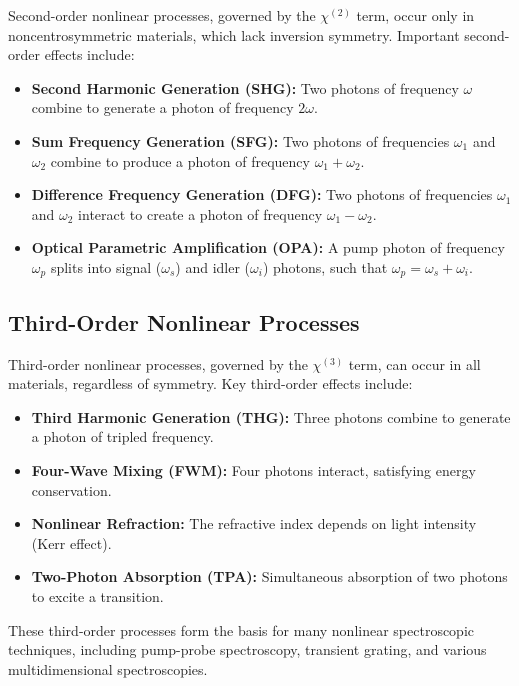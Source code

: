 \noindent 
Second-order nonlinear processes, governed by the $\chi^{(2)}$ term, occur only in noncentrosymmetric materials, which lack inversion symmetry. Important second-order effects include:

\begin{itemize}
	\item \textbf{Second Harmonic Generation (SHG):} Two photons of frequency $\omega$ combine to generate a photon of frequency $2\omega$.
	\item \textbf{Sum Frequency Generation (SFG):} Two photons of frequencies $\omega_1$ and $\omega_2$ combine to produce a photon of frequency $\omega_1 + \omega_2$.
	\item \textbf{Difference Frequency Generation (DFG):} Two photons of frequencies $\omega_1$ and $\omega_2$ interact to create a photon of frequency $\omega_1 - \omega_2$.
	\item \textbf{Optical Parametric Amplification (OPA):} A pump photon of frequency $\omega_p$ splits into signal ($\omega_s$) and idler ($\omega_i$) photons, such that $\omega_p = \omega_s + \omega_i$.
\end{itemize}


\subsection{Third-Order Nonlinear Processes}
\label{subsec:third_order}

\noindent 
Third-order nonlinear processes, governed by the $\chi^{(3)}$ term, can occur in all materials, regardless of symmetry. Key third-order effects include:

\begin{itemize}
	\item \textbf{Third Harmonic Generation (THG):} Three photons combine to generate a photon of tripled frequency.
	\item \textbf{Four-Wave Mixing (FWM):} Four photons interact, satisfying energy conservation.
	\item \textbf{Nonlinear Refraction:} The refractive index depends on light intensity (Kerr effect).
	\item \textbf{Two-Photon Absorption (TPA):} Simultaneous absorption of two photons to excite a transition.
\end{itemize}

\noindent 
These third-order processes form the basis for many nonlinear spectroscopic techniques, including pump-probe spectroscopy, transient grating, and various multidimensional spectroscopies.


